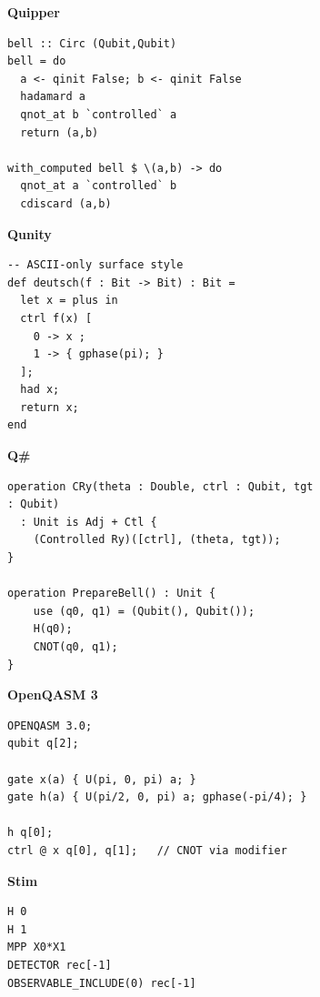 \begin{figure}[p]
\centering
\newcommand{\lcol}{0.52\linewidth}
\newcommand{\rcol}{0.44\linewidth}

\begin{subfigure}[t]{\lcol}
\centering
\textbf{Quipper}
\begin{verbatim}
bell :: Circ (Qubit,Qubit)
bell = do
  a <- qinit False; b <- qinit False
  hadamard a
  qnot_at b `controlled` a
  return (a,b)

with_computed bell $ \(a,b) -> do
  qnot_at a `controlled` b
  cdiscard (a,b)
\end{verbatim}
\end{subfigure}\hfill
\begin{subfigure}[t]{\rcol}
\centering
\textbf{Qunity}
\begin{verbatim}
-- ASCII-only surface style
def deutsch(f : Bit -> Bit) : Bit =
  let x = plus in
  ctrl f(x) [
    0 -> x ;
    1 -> { gphase(pi); }
  ];
  had x;
  return x;
end
\end{verbatim}
\end{subfigure}

\vspace{2em}

\begin{subfigure}[t]{\linewidth}
\raggedright
\textbf{Q\#}
\begin{verbatim}
operation CRy(theta : Double, ctrl : Qubit, tgt : Qubit)
  : Unit is Adj + Ctl {
    (Controlled Ry)([ctrl], (theta, tgt));
}

operation PrepareBell() : Unit {
    use (q0, q1) = (Qubit(), Qubit());
    H(q0);
    CNOT(q0, q1);
}
\end{verbatim}
\end{subfigure}

\vspace{2em}

\begin{subfigure}[t]{\lcol}
\centering
\textbf{OpenQASM 3}
\begin{verbatim}
OPENQASM 3.0;
qubit q[2];

gate x(a) { U(pi, 0, pi) a; }
gate h(a) { U(pi/2, 0, pi) a; gphase(-pi/4); }

h q[0];
ctrl @ x q[0], q[1];   // CNOT via modifier
\end{verbatim}

\end{subfigure}\hfill
\begin{subfigure}[t]{\rcol}
\centering\textbf{Stim}
\begin{verbatim}
H 0
H 1
MPP X0*X1
DETECTOR rec[-1]
OBSERVABLE_INCLUDE(0) rec[-1]
\end{verbatim}
\end{subfigure}


\end{figure}
